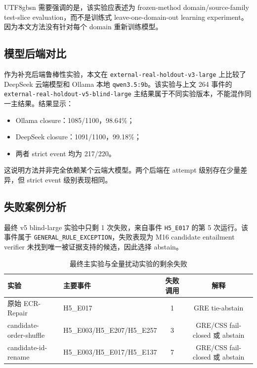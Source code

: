 \documentclass[11pt]{article}
\begin{document}
\begin{CJK*}{UTF8}{gbsn}
需要强调的是，该实验应表述为 frozen-method domain/source-family test-slice evaluation，而不是训练式 leave-one-domain-out learning experiment。因为本文方法没有针对每个 domain 重新训练模型。

\subsection{模型后端对比}

作为补充后端鲁棒性实验，本文在 \texttt{external-real-holdout-v3-large} 上比较了 DeepSeek 云端模型和 Ollama 本地 \texttt{qwen3.5:9b}。该实验与上文 264 事件的 \texttt{external-real-holdout-v5-blind-large} 主结果属于不同实验版本，不能混作同一主结果。结果显示：

\begin{itemize}
    \item Ollama closure：1085/1100，98.64\%；
    \item DeepSeek closure：1091/1100，99.18\%；
    \item 两者 strict event 均为 217/220。
\end{itemize}

这说明方法并非完全依赖某个云端大模型。两个后端在 attempt 级别存在少量差异，但 strict event 级别表现相同。

\subsection{失败案例分析}

最终 v5 blind-large 实验中只剩 1 次失败，来自事件 \texttt{H5\_E017} 的第 5 次运行。该事件属于 \texttt{GENERAL\_RULE\_EXCEPTION}，失败表现为 M16 candidate entailment verifier 未找到唯一被证据支持的候选，因此选择 abstain。

\begin{table}[t]
\centering
\caption{最终主实验与全量扰动实验的剩余失败}
\label{tab:failures}
\begin{tabular}{llcc}
\toprule
实验 & 主要事件 & 失败调用 & 解释 \\
\midrule
原始 ECR-Repair & H5\_E017 & 1 & GRE tie-abstain \\
candidate-order-shuffle & H5\_E003/H5\_E207/H5\_E257 & 3 & GRE/CSS fail-closed 或 abstain \\
candidate-id-rename & H5\_E003/H5\_E017/H5\_E137 & 7 & GRE/CSS fail-closed 或 abstain \\
\bottomrule
\end{tabular}
\end{table}


\end{CJK*}
\end{document}
